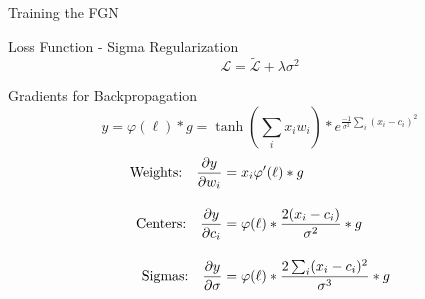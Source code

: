 \documentclass{beamer}
\begin{document}
\begin{frame}{Training the FGN}
    \begin{block}{Loss Function - Sigma Regularization}
    $$ \mathcal{L}  = \tilde{\mathcal{L} } + \lambda\sigma^2  $$
    \end{block}
    
    \begin{block}{Gradients for Backpropagation}
    $$ y =  \varphi(\ell)*g = \tanh(\sum_i x_i w_i) * e^{\frac{-1}{\sigma^2}\sum_{i}(x_i-c_i)^2}$$
    \vspace{-0.6cm}
    \begin{align*}
        \text{Weights:\quad} \frac{\partial y}{\partial w_i} &=  x_i \varphi'(\ell) * g  \\[1em]
        \text{Centers:\quad} \frac{\partial y}{\partial c_i} &= \varphi(\ell) * \frac{2(x_i-c_i)}{\sigma^2} * g \\[1em]
        \text{Sigmas:\quad} \frac{\partial y}{\partial \sigma} &= \varphi(\ell) * \frac{2\sum_{i}(x_i-c_i)^2}{\sigma^3}* g
    \end{align*}
    \end{block}
    \end{frame}
    
\end{document}
